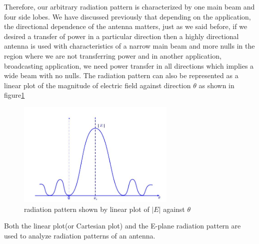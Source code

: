 Therefore, our arbitrary radiation pattern is characterized by one main beam and four side lobes. We have discussed previously that depending on the application, the directional dependence of the antenna matters, just as we said before, if we desired a transfer of power in a particular direction then a highly directional antenna is used with characteristics of a narrow main beam and more nulls in the region where we are not transferring power and in another application, broadcasting application, we need power transfer in all directions which implies a wide beam with no nulls.
The radiation pattern can also be represented as a linear plot of the magnitude of electric field against direction $\theta$  as shown in figure\ref{figure9}
\begin{figure}[h]
\centering
\includegraphics[height=5cm]{"./graphics/sinc function1"}
\caption{radiation pattern shown by linear plot of $|E|$ against $\theta$}
\label{figure9}
\end{figure}

Both the linear plot(or Cartesian plot) and the E-plane radiation pattern are used to analyze radiation patterns of an antenna.


